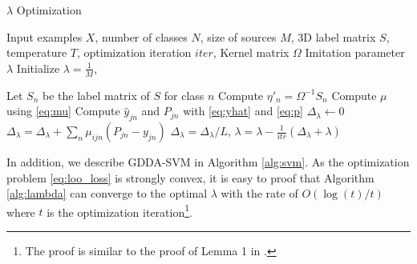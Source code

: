 \begin{algorithm}
	\caption{$\lambda$ Optimization}\label{alg:lambda}
\begin{algorithmic}
	\Require Input examples $X$, number of classes $N$, size of sources $M$, 3D label matrix $S$, temperature $T$, optimization iteration $iter$, Kernel matrix $\Omega$
    \Ensure Imitation parameter $\lambda$
    \State Initialize $\lambda = \frac{1}{M}$, 
    
    \State Let $S_n$ be the label matrix of $S$ for class $n$
    \State Compute $\eta'_n=\Omega^{-1}S_n$ 
    \EndFor
    \State Compute $\mu$ using \eqref{eq:mu}
	    \State Compute $\hat{y}_{jn}$ and $P_{jn}$ with \eqref{eq:yhat}  and \eqref{eq:p}
	    \State $\Delta_{\lambda} \leftarrow 0$
		    \State $\Delta_{\lambda} = \Delta_{\lambda}+\sum_n\mu_{ijn}\left(P_{jn}-{y}_{jn}\right)$
	    \EndFor
	    \State $\Delta_{\lambda} =\Delta_{\lambda}/L$, $\lambda = \lambda - \frac{1}{itr}(\Delta_{\lambda}+\lambda)$
    \EndFor
\end{algorithmic}	
\end{algorithm}
In addition, we describe GDDA-SVM in Algorithm \ref{alg:svm}. As the optimization problem \eqref{eq:loo_loss} is strongly convex, it is easy to proof that Algorithm \ref{alg:lambda} can converge to the optimal $\lambda$ with the rate of $O(\log(t)/t)$ where $t$ is the optimization iteration\footnote{The proof is similar to the proof of Lemma 1 in \cite{shalev2011pegasos}.}. 




